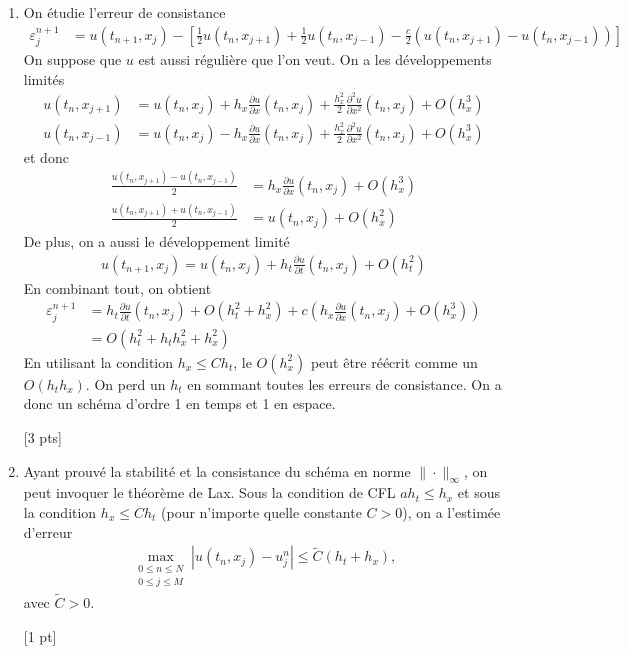 \documentclass[12pt]{article}
\begin{document}
\begin{cor}
\begin{enumerate}
  \item
    On \'etudie l'erreur de consistance
    \begin{align*}
      \varepsilon_j^{n+1}
      &= u(t_{n+1},x_j)
      - \left[
      \frac12 u(t_n,x_{j+1}) + \frac12 u(t_n , x_{j-1}) - \frac{c}2 (u(t_n,x_{j+1}) - u(t_n,x_{j-1}))
      \right]
    \end{align*}
    On suppose que $u$ est aussi r\'eguli\`ere que l'on veut.
    On a les d\'eveloppements limit\'es
    \begin{align*}
      u(t_n,x_{j+1})
      &= u(t_n,x_j) + h_x \frac{\partial u}{\partial x}(t_n,x_j)
        + \frac{h_x^2}{2} \frac{\partial^2 u}{\partial x^2}(t_n,x_j) + O(h_x^3)
      \\
      u(t_n,x_{j-1})
      &= u(t_n,x_j) - h_x \frac{\partial u}{\partial x}(t_n,x_j)
        + \frac{h_x^2}{2} \frac{\partial^2 u}{\partial x^2}(t_n,x_j) + O(h_x^3)
    \end{align*}
    et donc
    \begin{align*}
      \frac{u(t_n,x_{j+1}) - u(t_n,x_{j-1})}{2}
      &= h_x \frac{\partial u}{\partial x}(t_n , x_{j}) + O(h_x^3)
      \\
      \frac{u(t_n,x_{j+1}) + u(t_n,x_{j-1})}{2}
      &= u(t_n , x_j) + O(h_x^2)
    \end{align*}
    De plus, on a aussi le d\'eveloppement limit\'e
    \begin{align*}
      u(t_{n+1},x_j) = u(t_n,x_j) + h_t \frac{\partial u}{\partial t}(t_n,x_j)
      + O(h_t^2)
    \end{align*}
    En combinant tout, on obtient
    \begin{align*}
      \varepsilon_j^{n+1}
      &= h_t \frac{\partial u}{\partial t}(t_n,x_j) + O(h_t^2 + h_x^2)
        + c\left(h_x \frac{\partial u}{\partial x}(t_n,x_j) +O(h_x^3) \right)
      \\
      &= O(h_t^2 + h_t h_x^2 + h_x^2)
    \end{align*}
    En utilisant la condition $h_x \leq C h_t$, le $O(h_x^2)$ peut \^etre r\'e\'ecrit comme un $O(h_t h_x)$.
    On perd un $h_t$ en sommant toutes les erreurs de consistance.
    On a donc un sch\'ema d'ordre 1 en temps et 1 en espace.

    [3 pts]
    
  \item
    Ayant prouv\'e la stabilit\'e et la consistance du sch\'ema en norme $\| \cdot \|_{\infty}$, on peut invoquer le th\'eor\`eme de Lax.
    Sous la condition de CFL $a h_t \leq h_x$ et sous la condition $h_x \leq C h_t$ (pour n'importe quelle constante $C>0$),
    on a l'estim\'ee d'erreur
    \begin{align*}
      \max_{\substack{0 \leq n \leq N \\ 0 \leq j \leq M}} |u(t_n,x_j) - u_j^n| \leq \tilde{C}(h_t + h_x) ,
    \end{align*}
    avec $\tilde{C} > 0$.

    [1 pt]
  \end{enumerate}
  
\end{cor}
\end{document}
